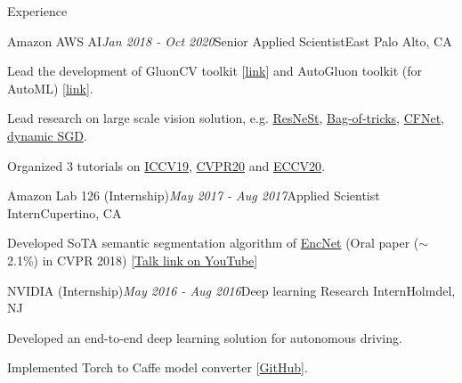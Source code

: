 \documentclass{resume} %
\begin{document}
\begin{rSection}{Experience}
\begin{rSubsection}{Amazon AWS AI}{\em Jan 2018 - Oct 2020}{Senior Applied Scientist}{East Palo Alto, CA} %
\item Lead the development of GluonCV toolkit [\href{https://cv.gluon.ai/contents.html}{link}] and AutoGluon toolkit (for AutoML) [\href{https://auto.gluon.ai/stable/index.html}{link}]. 
\item Lead research on large scale vision solution, e.g. \href{https://scholar.google.com/citations?view_op=view_citation&hl=en&user=gCoWdkUAAAAJ&citation_for_view=gCoWdkUAAAAJ:0KyAp5RtaNEC}{ResNeSt}, \href{https://scholar.google.com/citations?view_op=view_citation&hl=en&user=gCoWdkUAAAAJ&citation_for_view=gCoWdkUAAAAJ:fEOibwPWpKIC}{Bag-of-tricks}, \href{https://scholar.google.com/citations?view_op=view_citation&hl=en&user=gCoWdkUAAAAJ&citation_for_view=gCoWdkUAAAAJ:-_dYPAW6P2MC}{CFNet}, \href{https://scholar.google.com/citations?view_op=view_citation&hl=en&user=gCoWdkUAAAAJ&sortby=pubdate&citation_for_view=gCoWdkUAAAAJ:35r97b3x0nAC}{dynamic SGD}. 
\item Organized 3 tutorials on \href{https://iccv2019.thecvf.com/program/tutorials}{ICCV19}, \href{http://hangzhang.org/CVPR2020/}{CVPR20} and \href{https://hangzhang.org/ECCV2020/}{ECCV20}. 
\end{rSubsection}


\begin{rSubsection}{Amazon Lab 126 (Internship)}{\em May 2017 - Aug 2017}{Applied Scientist Intern}{Cupertino, CA}
\item Developed SoTA semantic segmentation algorithm of \href{https://scholar.google.com/citations?view_op=view_citation&hl=en&user=gCoWdkUAAAAJ&sortby=pubdate&citation_for_view=gCoWdkUAAAAJ:9Nmd_mFXekcC}{EncNet} (Oral paper ($\sim$2.1\%) in CVPR 2018) [\href{https://www.youtube.com/watch?v=vAhzirU4WqA}{Talk link on YouTube}]
\end{rSubsection}

\begin{rSubsection}{NVIDIA (Internship)}{\em May 2016 - Aug 2016}{Deep learning Research Intern}{Holmdel, NJ}
\item Developed an end-to-end deep learning solution for autonomous driving. 
\item Implemented Torch to Caffe model converter [\href{https://github.com/zhanghang1989/fb-caffe-exts}{GitHub}].
\end{rSubsection}

\end{rSection}
\end{document}
